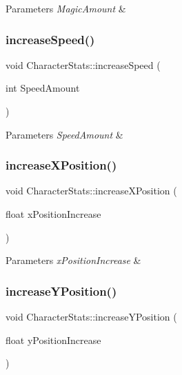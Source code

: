 \begin{DoxyParams}{Parameters}
{\em Magic\+Amount} & \\
\hline
\end{DoxyParams}
\mbox{\label{classCharacterStats_ad79f2f74380b875d11849baf1d43eefc}} 
\subsubsection{\texorpdfstring{increaseSpeed()}{increaseSpeed()}}
{\footnotesize\ttfamily void Character\+Stats\+::increase\+Speed (\begin{DoxyParamCaption}\item[{int}]{Speed\+Amount }\end{DoxyParamCaption})}


\begin{DoxyParams}{Parameters}
{\em Speed\+Amount} & \\
\hline
\end{DoxyParams}
\mbox{\label{classCharacterStats_a5f2fe8f102dbed7cfd5ec6960f2a3ca2}} 
\subsubsection{\texorpdfstring{increaseXPosition()}{increaseXPosition()}}
{\footnotesize\ttfamily void Character\+Stats\+::increase\+X\+Position (\begin{DoxyParamCaption}\item[{float}]{x\+Position\+Increase }\end{DoxyParamCaption})}


\begin{DoxyParams}{Parameters}
{\em x\+Position\+Increase} & \\
\hline
\end{DoxyParams}
\mbox{\label{classCharacterStats_a991c8cf5304f633dcbce921b3daebbc4}} 
\subsubsection{\texorpdfstring{increaseYPosition()}{increaseYPosition()}}
{\footnotesize\ttfamily void Character\+Stats\+::increase\+Y\+Position (\begin{DoxyParamCaption}\item[{float}]{y\+Position\+Increase }\end{DoxyParamCaption})}


